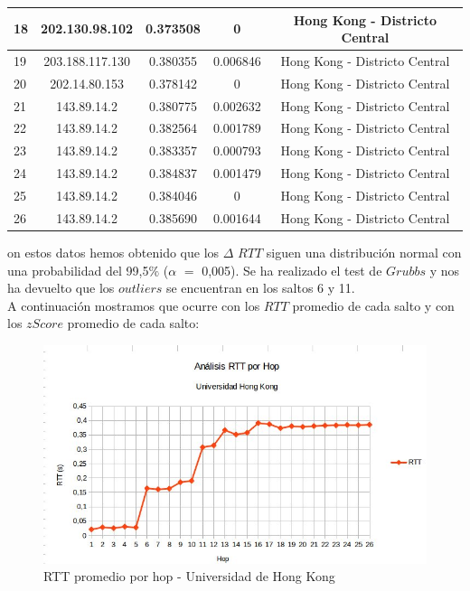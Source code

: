\begin{tabular}{ | l | c | c | c | c |}
	\hline
		18  &  202.130.98.102  &  0.373508 &  0 & Hong Kong - Districto Central\\
	\hline
		19  &  203.188.117.130 &  0.380355 &  0.006846 & Hong Kong - Districto Central\\
	\hline
		20  &  202.14.80.153  &  0.378142 &  0 & Hong Kong - Districto Central\\
	\hline
		21  &  143.89.14.2  &  0.380775 &  0.002632 & Hong Kong - Districto Central\\
	\hline
		22  &  143.89.14.2  &  0.382564 &  0.001789 & Hong Kong - Districto Central\\
	\hline
		23  &  143.89.14.2  &  0.383357 &  0.000793 & Hong Kong - Districto Central\\
	\hline
		24  &  143.89.14.2  &  0.384837 &  0.001479 & Hong Kong - Districto Central\\
	\hline
		25  &  143.89.14.2  &  0.384046 &  0 & Hong Kong - Districto Central\\
	\hline
		26  &  143.89.14.2  &  0.385690 &  0.001644 & Hong Kong - Districto Central\\
\hline
\end{tabular}

\bigskip
on estos datos hemos obtenido que los $\Delta$ $RTT$ siguen una distribución normal con una probabilidad del 99,5$\%$ ($\alpha$ $=$ 0,005).
Se ha realizado el test de $Grubbs$ y nos ha devuelto que los $outliers$ se encuentran en los saltos 6 y 11.\\

A continuación mostramos que ocurre con los $RTT$ promedio de cada salto y con los $zScore$ promedio de cada salto:

\begin{figure}[H]
\centering
\includegraphics[width=1\textwidth]{graficos/rTT_HongKong.jpg}
\caption{RTT promedio por hop - Universidad de Hong Kong}
\label{hongkong_rtt}
\end{figure}

